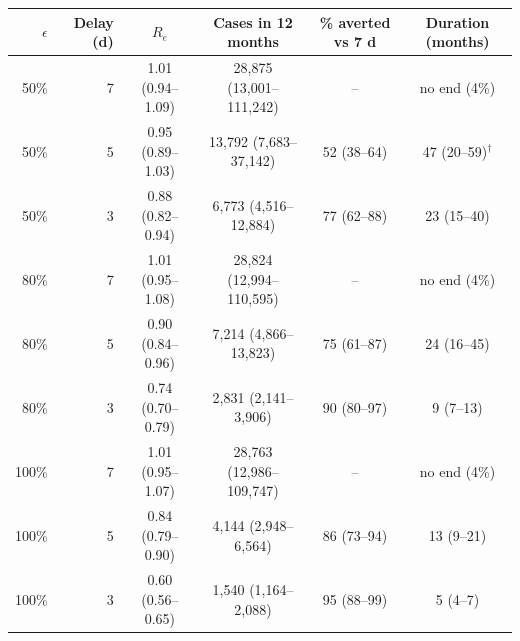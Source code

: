 \begin{tabular}{@{}rrcccc@{}}\toprule
$\epsilon$ & Delay (d) & $R_e$ & Cases in 12 months & \% averted vs 7 d & Duration (months)\\\midrule
50\% & 7 & 1.01 (0.94--1.09) & 28,875 (13,001--111,242) & -- & no end (4\%) \\
50\% & 5 & 0.95 (0.89--1.03) & 13,792 (7,683--37,142) & 52 (38--64) & 47 (20--59)$^\dagger$ \\
50\% & 3 & 0.88 (0.82--0.94) & 6,773 (4,516--12,884) & 77 (62--88) & 23 (15--40) \\
\midrule
80\% & 7 & 1.01 (0.95--1.08) & 28,824 (12,994--110,595) & -- & no end (4\%) \\
80\% & 5 & 0.90 (0.84--0.96) & 7,214 (4,866--13,823) & 75 (61--87) & 24 (16--45) \\
80\% & 3 & 0.74 (0.70--0.79) & 2,831 (2,141--3,906) & 90 (80--97) & 9 (7--13) \\
\midrule
100\% & 7 & 1.01 (0.95--1.07) & 28,763 (12,986--109,747) & -- & no end (4\%) \\
100\% & 5 & 0.84 (0.79--0.90) & 4,144 (2,948--6,564) & 86 (73--94) & 13 (9--21) \\
100\% & 3 & 0.60 (0.56--0.65) & 1,540 (1,164--2,088) & 95 (88--99) & 5 (4--7) \\
\bottomrule
\end{tabular}
